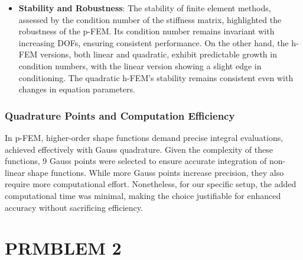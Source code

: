 \documentclass[twoside,twocolumn,10pt]{article}
\begin{document}
\begin{itemize}
    \item \textbf{Stability and Robustness}: The stability of finite element methods, assessed by the condition number of the stiffness matrix, highlighted the robustness of the p-FEM. Its condition number remains invariant with increasing DOFs, ensuring consistent performance. On the other hand, the h-FEM versions, both linear and quadratic, exhibit predictable growth in condition numbers, with the linear version showing a slight edge in conditioning. The quadratic h-FEM's stability remains consistent even with changes in equation parameters.
    
\end{itemize}

\subsubsection{Quadrature Points and Computation Efficiency}
In p-FEM, higher-order shape functions demand precise integral evaluations, achieved effectively with Gauss quadrature. Given the complexity of these functions, 9 Gauss points were selected to ensure accurate integration of non-linear shape functions. While more Gauss points increase precision, they also require more computational effort. Nonetheless, for our specific setup, the added computational time was minimal, making the choice justifiable for enhanced accuracy without sacrificing efficiency.

\section{\textbf{PRMBLEM 2}}
\end{document}
